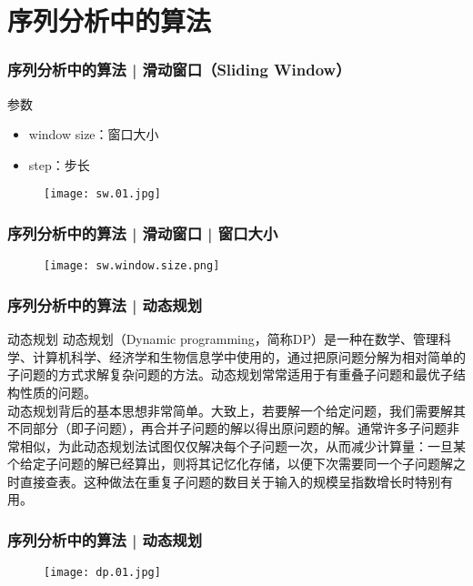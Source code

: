 \section{序列分析中的算法}
\begin{frame}
  \frametitle{序列分析中的算法 | 滑动窗口（Sliding Window）}
  \begin{block}{参数}
    \begin{itemize}
      \item window size：窗口大小
      \item step：步长
    \end{itemize}
  \end{block}
  \begin{figure}
    \centering
    \texttt{[image: sw.01.jpg]}
  \end{figure}
\end{frame}

\begin{frame}
  \frametitle{序列分析中的算法 | 滑动窗口 | 窗口大小}
  \begin{figure}
    \centering
    \texttt{[image: sw.window.size.png]}
  \end{figure}
\end{frame}

\begin{frame}
  \frametitle{序列分析中的算法 | 动态规划}
  \begin{block}{动态规划}
    动态规划（Dynamic programming，简称DP）是一种在数学、管理科学、计算机科学、经济学和生物信息学中使用的，通过把原问题分解为相对简单的子问题的方式求解复杂问题的方法。动态规划常常适用于有重叠子问题和最优子结构性质的问题。\\
    \vspace{0.5em}
动态规划背后的基本思想非常简单。大致上，若要解一个给定问题，我们需要解其不同部分（即子问题），再合并子问题的解以得出原问题的解。通常许多子问题非常相似，为此动态规划法试图仅仅解决每个子问题一次，从而减少计算量：一旦某个给定子问题的解已经算出，则将其记忆化存储，以便下次需要同一个子问题解之时直接查表。这种做法在重复子问题的数目关于输入的规模呈指数增长时特别有用。
  \end{block}
\end{frame}

\begin{frame}
  \frametitle{序列分析中的算法 | 动态规划}
  \begin{figure}
    \centering
    \texttt{[image: dp.01.jpg]}
  \end{figure}
\end{frame}

